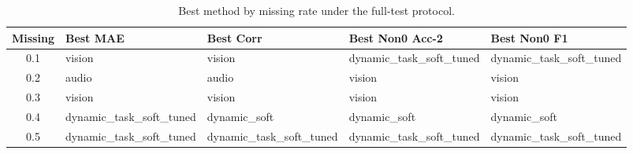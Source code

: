 \begin{table}[t]
\centering
\caption{Best method by missing rate under the full-test protocol.}
\begin{tabular}{c l l l l}
\toprule
Missing & Best MAE & Best Corr & Best Non0 Acc-2 & Best Non0 F1 \\
\midrule
0.1 & vision & vision & dynamic_task_soft_tuned & dynamic_task_soft_tuned \\
0.2 & audio & audio & vision & vision \\
0.3 & vision & vision & vision & vision \\
0.4 & dynamic_task_soft_tuned & dynamic_soft & dynamic_soft & dynamic_soft \\
0.5 & dynamic_task_soft_tuned & dynamic_task_soft_tuned & dynamic_task_soft_tuned & dynamic_task_soft_tuned \\
\bottomrule
\end{tabular}
\end{table}